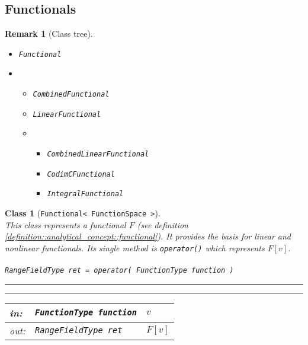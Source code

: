 \documentclass[a4paper,11pt]{article}
\numberwithin{equation}{section}
\newtheorem{class}[definition]{Class}
\newtheorem{remark}[definition]{Remark}
\newcommand{\theoremNewline}{\hspace{1mm}\\}
\newcommand{\theoremItemizeNewline}{\hspace{1mm}\vspace{-3mm}}
\newcommand{\CodeT}[1]{\textnormal{\texttt{#1}}}
\begin{document}
    \subsection{Functionals}

      \begin{remark}[Class tree]\theoremItemizeNewline
        \begin{itemize}
          \item[] \CodeT{Functional}
          \item[] \begin{itemize}
                    \item[$\rightarrow$] \CodeT{CombinedFunctional}
                    \item[$\rightarrow$] \CodeT{LinearFunctional}
                    \item[] \begin{itemize}
                            \item[$\rightarrow$] \CodeT{CombinedLinearFunctional}
                            \item[$\rightarrow$] \CodeT{CodimCFunctional}
                            \item[$\rightarrow$] \CodeT{IntegralFunctional}
                          \end{itemize}
                  \end{itemize}
        \end{itemize}
      \end{remark}

      \begin{class}[\CodeT{Functional< FunctionSpace >}]\theoremNewline
        This class represents a functional $F$ (see definition \ref{definition::analytical_concept::functional}). It
        provides the basis for linear and nonlinear functionals. Its single method is \CodeT{operator()} which
        represents ${F[v]}$.\\\\
        \CodeT{RangeFieldType ret = operator( FunctionType function )}
        \hrule
        \hrule
        \vspace{2mm}
        \begin{tabular}{ll|l}
          \textnormal{in:}
            &\CodeT{FunctionType function}
            & $v$\\
          \hline
          \textnormal{out:}
            & \CodeT{RangeFieldType ret}
            & ${F[v]}$
        \end{tabular}
      \end{class}
\end{document}
